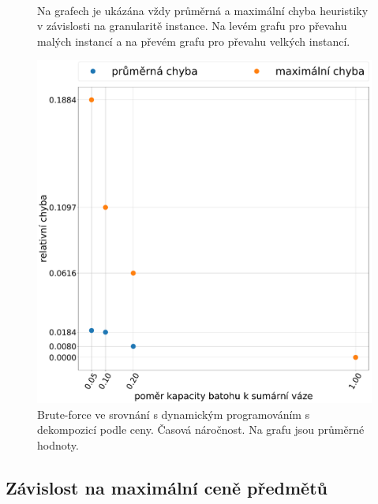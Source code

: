 \documentclass[11pt]{article}
\begin{document}
\begin{figure}
\begin{minipage}[c]{0.49\textwidth}
    \end{minipage}
    \\
   \caption{Na grafech je ukázána vždy průměrná a maximální chyba heuristiky v závislosti na granularitě instance. Na levém grafu pro převahu malých instancí a na převém grafu pro převahu velkých instancí.}\label{fig:GOEI}
    \end{figure} 
    
    

\begin{figure}[h]\centering
	\includegraphics[scale=0.2]{img/mHE}
 	\caption[1]{Brute-force ve srovnání s dynamickým programováním s dekompozicí podle ceny. Časová náročnost. Na grafu jsou průměrné hodnoty.}\label{fig:1}
 \end{figure} 	

\subsection{Závislost na maximální ceně předmětů}
\end{document}
